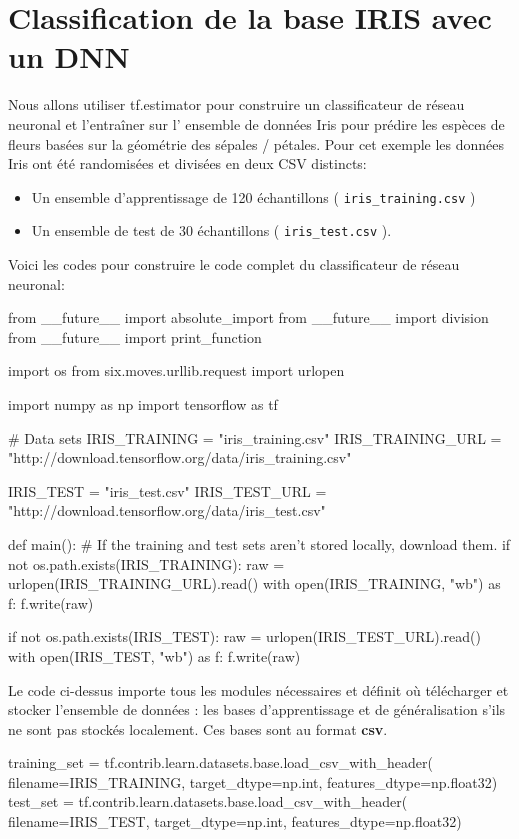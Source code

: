 \documentclass[a4paper,11pt]{book}
\begin{document}
\section{ Classification de la base IRIS avec un DNN }
Nous  allons utiliser  tf.estimator  pour construire un classificateur de réseau neuronal et l'entraîner sur l' ensemble de données Iris pour prédire les espèces de fleurs basées sur la géométrie des sépales / pétales. Pour cet exemple  les données Iris ont été randomisées et divisées en deux CSV distincts:
\begin {itemize}
\item Un ensemble d'apprentissage de 120 échantillons ( \verb+iris_training.csv+ )
\item	Un ensemble de test de 30 échantillons ( \verb+iris_test.csv+ ).
\end{itemize}
 Voici les  codes pour construire le code complet  du classificateur de réseau neuronal:
\begin{mypython}
from __future__ import absolute_import
from __future__ import division
from __future__ import print_function

import os
from six.moves.urllib.request import urlopen

import numpy as np
import tensorflow as tf

# Data sets
IRIS_TRAINING = "iris_training.csv"
IRIS_TRAINING_URL = "http://download.tensorflow.org/data/iris_training.csv"

IRIS_TEST = "iris_test.csv"
IRIS_TEST_URL = "http://download.tensorflow.org/data/iris_test.csv"

def main():
  # If the training and test sets aren't stored locally, download them.
  if not os.path.exists(IRIS_TRAINING):
    raw = urlopen(IRIS_TRAINING_URL).read()
    with open(IRIS_TRAINING, "wb") as f:
      f.write(raw)

  if not os.path.exists(IRIS_TEST):
    raw = urlopen(IRIS_TEST_URL).read()
    with open(IRIS_TEST, "wb") as f:
      f.write(raw)
\end{mypython}
Le code ci-dessus importe  tous les modules nécessaires et définit où télécharger et stocker l'ensemble de données : les bases d'apprentissage et de généralisation s'ils ne sont pas stockés localement.
Ces bases sont au format \textbf{csv}.
\begin{mypython}
training_set = tf.contrib.learn.datasets.base.load_csv_with_header(
      filename=IRIS_TRAINING,
      target_dtype=np.int,
      features_dtype=np.float32)
test_set = tf.contrib.learn.datasets.base.load_csv_with_header(
      filename=IRIS_TEST,
      target_dtype=np.int,
      features_dtype=np.float32)
\end{mypython}
\end{document}
